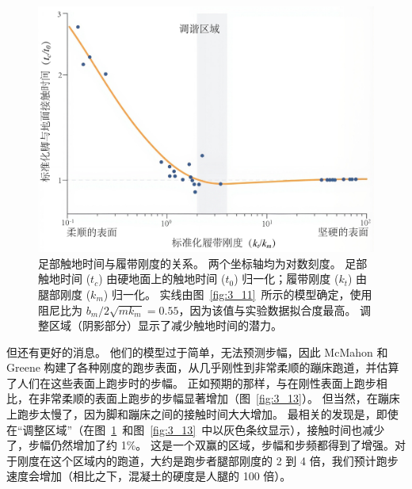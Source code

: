 \begin{figure}[!htb]
	\centering
	\includegraphics[width=1.0\linewidth]{chap3/3_12}
	\caption{足部触地时间与履带刚度的关系。
		两个坐标轴均为对数刻度。
		足部触地时间 ($t_c$) 由硬地面上的触地时间 ($t_0$) 归一化；履带刚度 ($k_t$) 由腿部刚度 ($k_m$) 归一化。
		实线由图~\ref{fig:3_11}~所示的模型确定，使用阻尼比为 ${b_m} / {2\sqrt{m k_m}} = 0.55$，因为该值与实验数据拟合度最高。
		调整区域（阴影部分）显示了减少触地时间的潜力\cite{mcmahon1984muscles}。 \label{fig:3_12}}
\end{figure}

但还有更好的消息。
他们的模型过于简单，无法预测步幅，因此 McMahon 和 Greene 构建了各种刚度的跑步表面，从几乎刚性到非常柔顺的蹦床跑道，并估算了人们在这些表面上跑步时的步幅。
正如预期的那样，与在刚性表面上跑步相比，在非常柔顺的表面上跑步的步幅显著增加（图~\ref{fig:3_13}）。
但当然，在蹦床上跑步太慢了，因为脚和蹦床之间的接触时间大大增加。
最相关的发现是，即使在“调整区域”（在图~\ref{fig:3_12}~和图~\ref{fig:3_13}~中以灰色条纹显示），接触时间也减少了，步幅仍然增加了约 1\%。
这是一个双赢的区域，步幅和步频都得到了增强。对于刚度在这个区域内的跑道，大约是跑步者腿部刚度的 2 到 4 倍，我们预计跑步速度会增加（相比之下，混凝土的硬度是人腿的 100 倍）。

